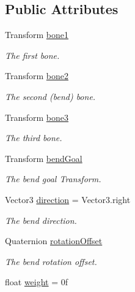 \subsection*{Public Attributes}
\begin{DoxyCompactItemize}
\item 
Transform \mbox{\hyperlink{class_root_motion_1_1_final_i_k_1_1_i_k_constraint_bend_ab6e75695e82a3482750957d897f151c0}{bone1}}
\begin{DoxyCompactList}\small\item\em The first bone. \end{DoxyCompactList}\item 
Transform \mbox{\hyperlink{class_root_motion_1_1_final_i_k_1_1_i_k_constraint_bend_a99406d65ccfc0a4d9abdf07639f9cff9}{bone2}}
\begin{DoxyCompactList}\small\item\em The second (bend) bone. \end{DoxyCompactList}\item 
Transform \mbox{\hyperlink{class_root_motion_1_1_final_i_k_1_1_i_k_constraint_bend_aa255be86be652ea30ee9c4fcd1094a29}{bone3}}
\begin{DoxyCompactList}\small\item\em The third bone. \end{DoxyCompactList}\item 
Transform \mbox{\hyperlink{class_root_motion_1_1_final_i_k_1_1_i_k_constraint_bend_acddd608db296ef32d7e3396918d0cfad}{bend\+Goal}}
\begin{DoxyCompactList}\small\item\em The bend goal Transform. \end{DoxyCompactList}\item 
Vector3 \mbox{\hyperlink{class_root_motion_1_1_final_i_k_1_1_i_k_constraint_bend_acd2ad4e1bb8486766ee479a6fe01b3fc}{direction}} = Vector3.\+right
\begin{DoxyCompactList}\small\item\em The bend direction. \end{DoxyCompactList}\item 
Quaternion \mbox{\hyperlink{class_root_motion_1_1_final_i_k_1_1_i_k_constraint_bend_ad0f9c37f300f1899cd3636710d310bf9}{rotation\+Offset}}
\begin{DoxyCompactList}\small\item\em The bend rotation offset. \end{DoxyCompactList}\item 
float \mbox{\hyperlink{class_root_motion_1_1_final_i_k_1_1_i_k_constraint_bend_ab50c664029898e7fefaab81134793ed0}{weight}} = 0f

\end{DoxyCompactItemize}
